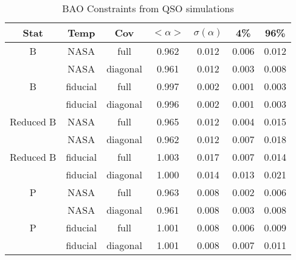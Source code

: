 \begin{table}
\caption{‌BAO Constraints from QSO simulations}
\begin{center}
\begin{tabular}{ccccccc}
Stat & Temp & Cov &$< \alpha >$ & $\sigma(\alpha) $ & 4\%&96\%\\
\hline
                            B  &       NASA & full & 0.962 & 0.012& 0.006 & 0.012\\ 
 &       NASA & diagonal & 0.961 & 0.012 &0.003 &0.008\\ 
\hline
                            B  &   fiducial & full & 0.997 & 0.002& 0.001 & 0.003\\ 
 &   fiducial & diagonal & 0.996 & 0.002 &0.001 &0.003\\ 
\hline
                    Reduced B  &       NASA & full & 0.965 & 0.012& 0.004 & 0.015\\ 
 &       NASA & diagonal & 0.962 & 0.012 &0.007 &0.018\\ 
\hline
                    Reduced B  &   fiducial & full & 1.003 & 0.017& 0.007 & 0.014\\ 
 &   fiducial & diagonal & 1.000 & 0.014 &0.013 &0.021\\ 
\hline
                            P  &       NASA & full & 0.963 & 0.008& 0.002 & 0.006\\ 
 &       NASA & diagonal & 0.961 & 0.008 &0.003 &0.008\\ 
\hline
                            P  &   fiducial & full & 1.001 & 0.008& 0.006 & 0.009\\ 
 &   fiducial & diagonal & 1.001 & 0.008 &0.007 &0.011
\end{tabular}
\end{center}
\label{label:qso}
\end{table}





